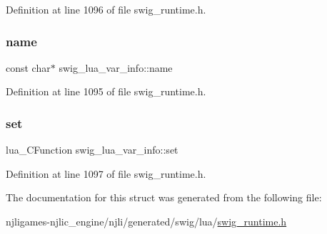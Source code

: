 Definition at line 1096 of file swig\+\_\+runtime.\+h.

\mbox{\label{structswig__lua__var__info_a59daefcace30c1ffb1f58bd7829f8449}} 
\subsubsection{\texorpdfstring{name}{name}}
{\footnotesize\ttfamily const char$\ast$ swig\+\_\+lua\+\_\+var\+\_\+info\+::name}



Definition at line 1095 of file swig\+\_\+runtime.\+h.

\mbox{\label{structswig__lua__var__info_aea961df3cc15877e8354cb535bef2c1e}} 
\subsubsection{\texorpdfstring{set}{set}}
{\footnotesize\ttfamily lua\+\_\+\+C\+Function swig\+\_\+lua\+\_\+var\+\_\+info\+::set}



Definition at line 1097 of file swig\+\_\+runtime.\+h.



The documentation for this struct was generated from the following file\+:\begin{DoxyCompactItemize}
\item 
njligames-\/njlic\+\_\+engine/njli/generated/swig/lua/\mbox{\hyperlink{swig__runtime_8h}{swig\+\_\+runtime.\+h}}\end{DoxyCompactItemize}
